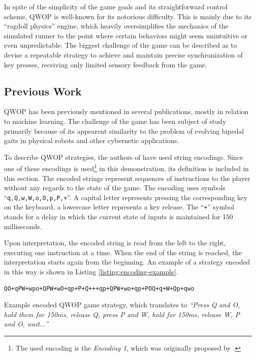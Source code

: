In spite of the simplicity of the game goals and its straightforward control scheme, QWOP is well-known for its notorious difficulty. This is mainly due to its ``ragdoll physics'' engine, which heavily oversimplifies the mechanics of the simulated runner to the point where certain behaviors might seem unintuitive or even unpredictable. \cite{QwopHomework} The biggest challenge of the game can be described as to devise a repeatable strategy to achieve and maintain precise synchronization of key presses, receiving only limited sensory feedback from the game.

\subsection{Previous Work}
QWOP has been previously mentioned in several publications, mostly in relation to machine learning. The challenge of the game has been subject of study primarily because of its appearent similarity to the problem of evolving bipedal gaits in physical robots and other cybernetic applications.

To describe QWOP strategies, the authors of \cite{EvolvingQwopGaits} have used string encodings. Since one of these encodings is used\footnote{The used encoding is the \textit{Encoding 1}, which was originally proposed by \cite{QwopEncoding}.} in this demonstration, its definition is included in this section. The encoded strings represent sequences of instructions to the player without any regards to the state of the game. The encoding uses symbols ``\texttt{q,Q,w,W,o,O,p,P,+}''. A capital letter represents pressing the corresponding key on the keyboard, a lowercase letter represents a key release. The ``\texttt{+}'' symbol stands for a delay in which the current state of inputs is maintained for 150 milliseconds. \cite{EvolvingQwopGaits}

Upon interpretation, the encoded string is read from the left to the right, executing one instruction at a time. When the end of the string is reached, the interpretation starts again from the beginning. An example of a strategy encoded in this way is shown in Listing \ref{listing:encoding-example}.

\begin{listing}[ht]
	\begin{verbatim}
QO+qPW+wpo+QPW+wO+qp+P+Q+++qp+QPW+wo+qp+POQ+q+W+Qp+qwo
	\end{verbatim}
	\caption[Example encoded QWOP game strategy.]{Example encoded QWOP game strategy, which translates to \textit{``Press Q and O, hold them for 150ms, release Q, press P and W, hold for 150ms, release W, P and O, wait...''} \cite{EvolvingQwopGaits}}
	\label{listing:encoding-example}
\end{listing}

